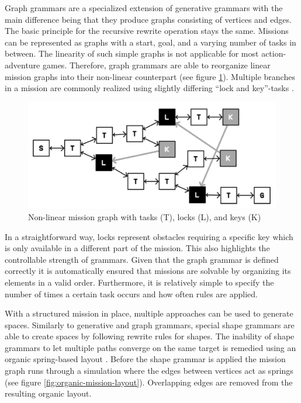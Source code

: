 Graph grammars are a specialized extension of generative grammars with the main difference being that they produce graphs consisting of vertices and edges.
The basic principle for the recursive rewrite operation stays the same.
Missions can be represented as graphs with a start, goal, and a varying number of tasks in between.
The linearity of such simple graphs is not applicable for most action-adventure games.
Therefore, graph grammars are able to reorganize linear mission graphs into their non-linear counterpart (see figure \ref{fig:mission-graph}).
Multiple branches in a mission are commonly realized using slightly differing ``lock and key''-tasks \cite{Dormans2011}.

\begin{figure}[H]
    \centering
    \includegraphics[width=\linewidth]{assets/mission-graph.png}
    \caption{Non-linear mission graph with tasks (T), locks (L), and keys (K) \protect\cite{Dormans2011}}
    \label{fig:mission-graph}
\end{figure}

In a straightforward way, locks represent obstacles requiring a specific key which is only available in a different part of the mission.
This also highlights the controllable strength of grammars. 
Given that the graph grammar is defined correctly it is automatically ensured that missions are solvable by organizing its elements in a valid order.
Furthermore, it is relatively simple to specify the number of times a certain task occurs and how often rules are applied.

With a structured mission in place, multiple approaches can be used to generate spaces.
Similarly to generative and graph grammars, special shape grammars are able to create spaces by following rewrite rules for shapes.
The inability of shape grammars to let multiple paths converge on the same target is remedied using an organic spring-based layout \cite{Dormans2011}.
Before the shape grammar is applied the mission graph runs through a simulation where the edges between vertices act as springs (see figure \ref{fig:organic-mission-layout}).
Overlapping edges are removed from the resulting organic layout.


